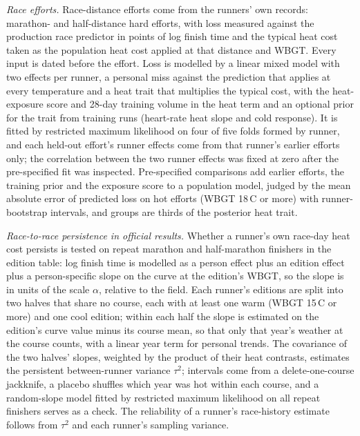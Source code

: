\documentclass[11pt]{article}
\renewcommand{\_}{\textunderscore\allowbreak}
\begin{document}
\emph{Race efforts.} Race-distance efforts come from the runners' own records: marathon- and half-distance hard efforts, with loss measured against the production race predictor in points of log finish time and the typical heat cost taken as the population heat cost applied at that distance and WBGT. Every input is dated before the effort. Loss is modelled by a linear mixed model with two effects per runner, a personal miss against the prediction that applies at every temperature and a heat trait that multiplies the typical cost, with the heat-exposure score and 28-day training volume in the heat term and an optional prior for the trait from training runs (heart-rate heat slope and cold response). It is fitted by restricted maximum likelihood on four of five folds formed by runner, and each held-out effort's runner effects come from that runner's earlier efforts only; the correlation between the two runner effects was fixed at zero after the pre-specified fit was inspected. Pre-specified comparisons add earlier efforts, the training prior and the exposure score to a population model, judged by the mean absolute error of predicted loss on hot efforts (WBGT 18\,\textdegree C or more) with runner-bootstrap intervals, and groups are thirds of the posterior heat trait.

\emph{Race-to-race persistence in official results.} Whether a runner's own race-day heat cost persists is tested on repeat marathon and half-marathon finishers in the edition table: log finish time is modelled as a person effect plus an edition effect plus a person-specific slope on the curve at the edition's WBGT, so the slope is in units of the scale $\alpha$, relative to the field. Each runner's editions are split into two halves that share no course, each with at least one warm (WBGT 15\,\textdegree C or more) and one cool edition; within each half the slope is estimated on the edition's curve value minus its course mean, so that only that year's weather at the course counts, with a linear year term for personal trends. The covariance of the two halves' slopes, weighted by the product of their heat contrasts, estimates the persistent between-runner variance $\tau^2$; intervals come from a delete-one-course jackknife, a placebo shuffles which year was hot within each course, and a random-slope model fitted by restricted maximum likelihood on all repeat finishers serves as a check. The reliability of a runner's race-history estimate follows from $\tau^2$ and each runner's sampling variance.
\end{document}
